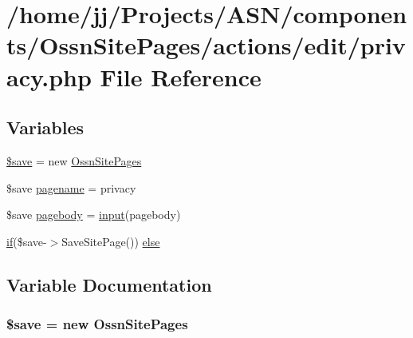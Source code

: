 \hypertarget{components_2_ossn_site_pages_2actions_2edit_2privacy_8php}{}\section{/home/jj/\+Projects/\+A\+S\+N/components/\+Ossn\+Site\+Pages/actions/edit/privacy.php File Reference}
\label{components_2_ossn_site_pages_2actions_2edit_2privacy_8php}
\subsection*{Variables}
\begin{DoxyCompactItemize}
\item 
\hyperlink{components_2_ossn_site_pages_2actions_2edit_2privacy_8php_a00e6dff44e00c36820da5508c6d9aba3}{\$save} = new \hyperlink{class_ossn_site_pages}{Ossn\+Site\+Pages}
\item 
\$save \hyperlink{components_2_ossn_site_pages_2actions_2edit_2privacy_8php_a80628cda62ee6fb56006a1a49ea33304}{pagename} = \textquotesingle{}privacy\textquotesingle{}
\item 
\$save \hyperlink{components_2_ossn_site_pages_2actions_2edit_2privacy_8php_ac5e77655d4436fc87c23b803e772f55b}{pagebody} = \hyperlink{ossn_8lib_8input_8php_a64ebee98b041c4f75f71ed3cd73cc8ed}{input}(\textquotesingle{}pagebody\textquotesingle{})
\item 
\hyperlink{jquery_8tokeninput_8js_ad8dd46a3cbc004569e34401e9e71771a}{if}(\$save-\/$>$Save\+Site\+Page()) \hyperlink{components_2_ossn_site_pages_2actions_2edit_2privacy_8php_a3652d10f06e3bfc8edd1455fd0c357ae}{else}
\end{DoxyCompactItemize}


\subsection{Variable Documentation}
\subsubsection[{\texorpdfstring{\$save}{$save}}]{\setlength{\rightskip}{0pt plus 5cm}\$save = new {\bf Ossn\+Site\+Pages}}\hypertarget{components_2_ossn_site_pages_2actions_2edit_2privacy_8php_a00e6dff44e00c36820da5508c6d9aba3}{}\label{components_2_ossn_site_pages_2actions_2edit_2privacy_8php_a00e6dff44e00c36820da5508c6d9aba3}


